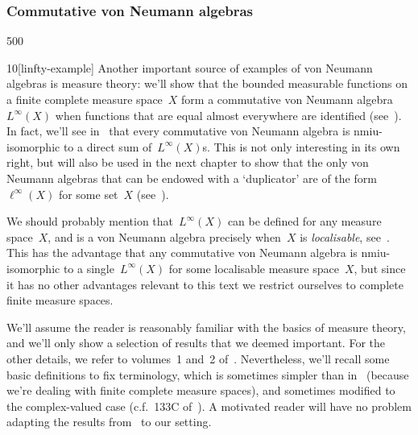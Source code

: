 \subsubsection{Commutative von Neumann algebras}
\begin{parsec}{500}%
\begin{point}{10}[linfty-example]%
Another important source of examples of von 
Neumann algebras is measure theory:
we'll show that the bounded measurable
functions on a 
finite complete
measure space~$X$
form a commutative von Neumann algebra~$L^\infty(X)$
when functions that are equal almost everywhere are identified
(see~).
In fact, 
we'll see in~
that
every commutative von Neumann algebra is nmiu-isomorphic
to a direct sum of~$L^\infty(X)$s.
This is not only interesting in its own right,
but will also
be used in the next chapter
to show that the only von Neumann algebras
that can be endowed with a `duplicator'
are of the form~$\ell^\infty(X)$
for some set~$X$ (see~).

We should probably mention that~$L^\infty(X)$
can be defined for any measure space~$X$,
and is a von Neumann algebra
precisely when~$X$ is \emph{localisable},
see~\cite{segal1951}.
This has the advantage that any commutative von Neumann algebra
is nmiu-isomorphic
to a single~$L^\infty(X)$
for some localisable measure space~$X$,
but since it has no other advantages relevant
to this text
we restrict ourselves to complete finite measure spaces.

We'll assume the reader is reasonably familiar with 
the basics of measure theory,
and we'll only show a selection of results
that we deemed important.
For the other details,
we refer to volumes~1 and~2 of~\cite{fremlin}.
Nevertheless,
we'll  recall
some basic definitions
to fix terminology,
which is sometimes simpler than in~\cite{fremlin}
(because we're dealing with finite complete measure spaces),
and sometimes modified to the complex-valued case
(c.f.~133C of~\cite{fremlin}).
A motivated reader will have no problem adapting
the results from~\cite{fremlin} 
to our setting.
\end{point}
\end{parsec}%
